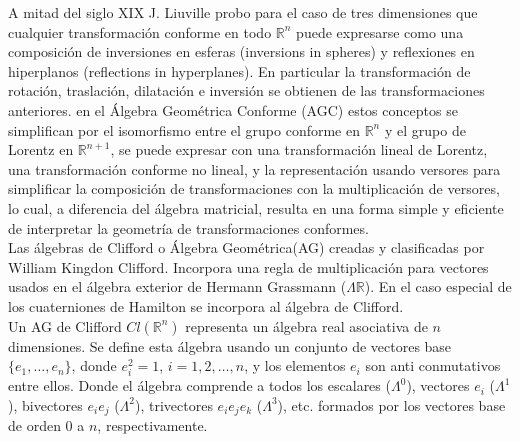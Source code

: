 A mitad del siglo XIX J. Liuville probo para el caso de tres dimensiones que cualquier transformación conforme en todo $\mathbb{ R}^n$ puede expresarse como una composición de inversiones en esferas (inversions in spheres) y reflexiones en hiperplanos (reflections in hyperplanes). En particular la transformación de rotación, traslación, dilatación e inversión se obtienen de las transformaciones anteriores. en el Álgebra Geométrica Conforme (AGC) estos conceptos se simplifican por el isomorfismo entre el grupo \gls{conforme} en $\mathbb{R}^n$ y el grupo de Lorentz en $\mathbb{R}^{n+1}$, se puede expresar con una transformación lineal de Lorentz, una transformación conforme no lineal, y la representación usando versores para simplificar la composición de transformaciones  con la multiplicación de versores, lo cual, a diferencia del álgebra matricial, resulta en una forma simple y eficiente de interpretar la geometría de transformaciones conformes\cite{BayroCorrochano2010}. \\



Las álgebras de Clifford o Álgebra Geométrica(AG) creadas y clasificadas por William Kingdon Clifford. Incorpora una regla de multiplicación para vectores usados en el álgebra exterior de Hermann Grassmann ($\Lambda \mathbb{R} $). En el caso especial de los cuaterniones de Hamilton se incorpora al álgebra de Clifford.\\


Un AG de Clifford $Cl(\mathbb{R}^{n})$ representa un álgebra real asociativa de $n$ dimensiones. Se define esta álgebra usando un conjunto de vectores base $\{e_1,\ldots,e_n\}$, donde $e_i^2=1$, $i=1,2,\ldots,n$, y los elementos $e_i$ son anti conmutativos entre ellos. Donde el álgebra comprende a todos los escalares ($\Lambda^0$), vectores $e_i$ ($\Lambda^1$), bivectores $e_i e_j$ ($\Lambda^2$), trivectores $e_i e_j e_k$ ($\Lambda^3$), etc. formados por los vectores base de orden $0$ a $n$, respectivamente. \\


